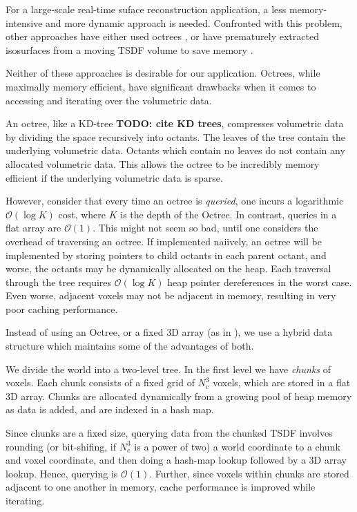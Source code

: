 \documentclass[conference,10pt]{IEEEtran}
\begin{document}
For a large-scale real-time suface reconstruction application, a less
memory-intensive and more dynamic approach is needed. Confronted with this
problem, other approaches have either used  octrees \cite{Wurm2010}, or have
prematurely extracted isosurfaces from a moving TSDF volume to save memory
\cite{Whelan2013}.

Neither of these approaches is desirable for our application. Octrees, while
maximally memory efficient, have significant drawbacks when it comes to
accessing and iterating over the volumetric data.

An octree, like a KD-tree \textbf{TODO: cite KD trees}, compresses volumetric
data by dividing the space recursively into octants. The leaves of the tree
contain the underlying volumetric data. Octants which contain no leaves do not
contain any allocated volumetric data. This allows the octree to be incredibly
memory efficient if the underlying volumetric data is sparse. 

However, consider that every time an octree is \emph{queried}, one incurs a
logarithmic $\mathcal{O}(\log K)$ cost, where $K$ is the depth of the Octree. In
contrast, queries in a flat array are $\mathcal{O}(1)$. This might not seem so
bad, until one considers the overhead of traversing an octree. If implemented naiively, an
octree will be implemented by storing pointers to child octants in each parent
octant, and worse, the octants may be dynamically allocated on the heap. Each
traversal through the tree requires $\mathcal{O}(\log K)$ heap pointer
dereferences in the worst case. Even worse, adjacent voxels may not be adjacent
in memory, resulting in very poor caching performance.

Instead of using an Octree, or a fixed 3D array (as in \cite{Newcombe,
Whelan2013}), we use a hybrid data structure which maintains some of the
advantages of both. 

We divide the world into a two-level tree. In the first level we have
\emph{chunks} of voxels. Each chunk consists of a fixed grid of $N_c^3$ voxels,
which are stored in a flat 3D array. Chunks are allocated dynamically from a
growing pool of heap memory as data is added, and are indexed in a hash map.

Since chunks are a fixed size, querying data from the chunked TSDF involves
rounding (or bit-shifing, if $N_c^3$ is a power of two) a world coordinate to a
chunk and voxel coordinate, and then doing a hash-map lookup followed by a 3D
array lookup. Hence, querying is $\mathcal{O}(1)$. Further, since voxels within
chunks are stored adjacent to one another in memory, cache performance is
improved while iterating.
\end{document}
